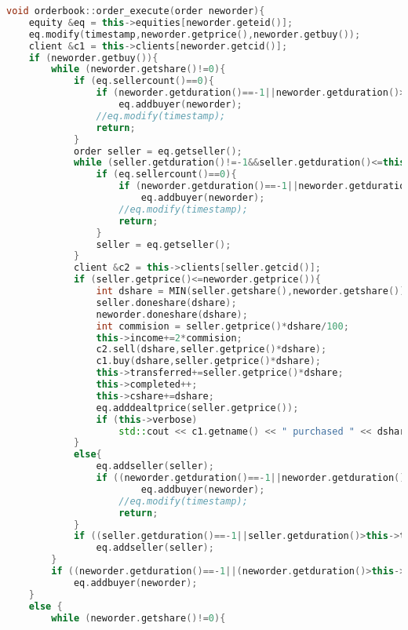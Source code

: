 \documentclass{article}
\begin{document}
\begin{lstlisting}[title=orderbook.cpp,language=C++]
void orderbook::order_execute(order neworder){
    equity &eq = this->equities[neworder.geteid()];
    eq.modify(timestamp,neworder.getprice(),neworder.getbuy());
    client &c1 = this->clients[neworder.getcid()];
    if (neworder.getbuy()){
        while (neworder.getshare()!=0){
            if (eq.sellercount()==0){
                if (neworder.getduration()==-1||neworder.getduration()>this->timestamp)
                    eq.addbuyer(neworder);
                //eq.modify(timestamp);
                return;
            }
            order seller = eq.getseller();
            while (seller.getduration()!=-1&&seller.getduration()<=this->timestamp) {
                if (eq.sellercount()==0){
                    if (neworder.getduration()==-1||neworder.getduration()>this->timestamp)
                        eq.addbuyer(neworder);
                    //eq.modify(timestamp);
                    return;
                }
                seller = eq.getseller();
            }
            client &c2 = this->clients[seller.getcid()];
            if (seller.getprice()<=neworder.getprice()){
                int dshare = MIN(seller.getshare(),neworder.getshare());
                seller.doneshare(dshare);
                neworder.doneshare(dshare);
                int commision = seller.getprice()*dshare/100;
                this->income+=2*commision;
                c2.sell(dshare,seller.getprice()*dshare);
                c1.buy(dshare,seller.getprice()*dshare);
                this->transferred+=seller.getprice()*dshare;
                this->completed++;
                this->cshare+=dshare;
                eq.adddealtprice(seller.getprice());
                if (this->verbose)
                    std::cout << c1.getname() << " purchased " << dshare << " shares of " << eq.getname() << " from " << c2.getname() << " for $" << seller.getprice() << "/share" << std::endl; 
            }
            else{
                eq.addseller(seller);
                if ((neworder.getduration()==-1||neworder.getduration()>this->timestamp)&&(neworder.getshare()!=0))
                        eq.addbuyer(neworder);
                    //eq.modify(timestamp);
                    return;
            }
            if ((seller.getduration()==-1||seller.getduration()>this->timestamp)&&(seller.getshare()!=0))
                eq.addseller(seller);
        }
        if ((neworder.getduration()==-1||(neworder.getduration()>this->timestamp&&neworder.getduration()!=neworder.getts()))&&(neworder.getshare()!=0))
            eq.addbuyer(neworder);
    }
    else {
        while (neworder.getshare()!=0){

\end{lstlisting}
\end{document}
